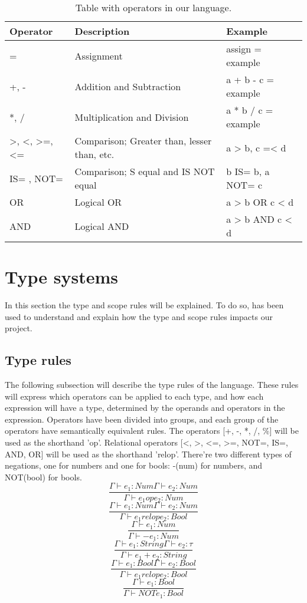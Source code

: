 \begin{table}[h]
	\centering
	\begin{tabular}{|l|l|l|}
		\hline
		Operator & Description & Example                \\ \hline
		=			& Assignment &  assign = example\\ \hline
		+, -		& Addition and Subtraction &  a + b - c = example \\ \hline
		*, /		& Multiplication and Division &  a * b / c = example\\ \hline
		>, <, >=, <= & Comparison; Greater than, lesser than, etc. & a > b, c =< d \\ \hline
		IS=	, NOT=	 &  Comparison; S equal and IS NOT equal & b IS= b, a NOT= c \\ \hline
		OR			& Logical OR & a > b OR c < d  \\ \hline
		AND		& Logical AND &	a > b AND c < d  \\ \hline
	\end{tabular}
	\caption{Table with operators in our language.}
	\label{fig:OperatorTable}
\end{table}

\section{Type systems}
In this section the type and scope rules will be explained. To do so, \citep{Sebesta} has been used to understand and explain how the type and scope rules impacts our project.

\subsection{Type rules}
The following subsection will describe the type rules of the language. These rules will express which operators can be applied to each type, and how each expression will have a type, determined by the operands and operators in the expression.
Operators have been divided into groups, and each group of the operators have semantically equivalent rules.
The operators [+, -, *, /, \%] will be used as the shorthand 'op'. Relational operators [<, >, <=, >=, NOT=, IS=, AND, OR] will be used as the shorthand 'relop'. There're two different types of negations, one for numbers and one for bools: -(num) for numbers, and NOT(bool) for bools.
\[
\dfrac{\Gamma \vdash e_1 : Num \Gamma \vdash e_2 : Num}{\Gamma \vdash e_1 op e_2 : Num}
\]
\[
\dfrac{\Gamma \vdash e_1 : Num \Gamma \vdash e_2 : Num}{\Gamma \vdash e_1 relop e_2 : Bool}
\]
\[
\dfrac{\Gamma \vdash e_1 : Num}{\Gamma \vdash -e_1 : Num}
\]
\[
\dfrac{\Gamma \vdash e_1 : String \Gamma \vdash e_2 : \tau}{\Gamma \vdash e_1 + e_2 : String}
\]
\[
\dfrac{\Gamma \vdash e_1 : Bool \Gamma \vdash e_2 : Bool}{\Gamma \vdash e_1 relop e_2 : Bool}
\]
\[
\dfrac{\Gamma \vdash e_1 : Bool}{\Gamma \vdash NOTe_1 : Bool}
\]
